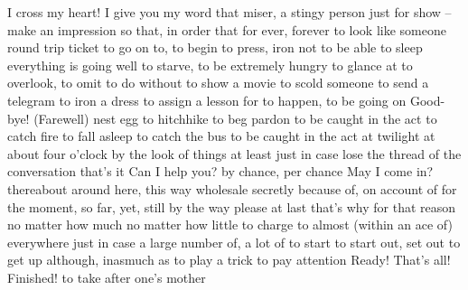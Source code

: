 {I cross my heart!}
{I give you my word that}
{miser, a stingy person}
{just for show – make an impression}
{so that, in order that}
{for ever, forever}
{to look like someone}
{round trip ticket}
{to go on to, to begin}
{to press, iron}
{not to be able to sleep}
{everything is going well}
{to starve, to be extremely hungry}
{to glance at}
{to overlook, to omit}
{to do without}
{to show a movie}
{to scold someone}
{to send a telegram}
{to iron a dress}
{to assign a lesson for}
{to happen, to be going on}
{Good-bye! (Farewell)}
{nest egg}
{to hitchhike}
{to beg pardon}
{to be caught in the act}
{to catch fire}
{to fall asleep}
{to catch the bus}
{to be caught in the act}
{at twilight}
{at about four o’clock}
{by the look of things}
{at least}
{just in case}
{lose the thread of the conversation}
{that’s it}
{Can I help you?}
{by chance, per chance}
{May I come in?}
{thereabout}
{around here, this way}
{wholesale}
{secretly}
{because of, on account of}
{for the moment, so far, yet, still}
{by the way}
{please}
{at last}
{that’s why}
{for that reason}
{no matter how much}
{no matter how little}
{to charge to}
{almost (within an ace of)}
{everywhere}
{just in case}
{a large number of, a lot of}
{to start}
{to start out, set out}
{to get up}
{although, inasmuch as}
{to play a trick}
{to pay attention}
{Ready! That’s all! Finished!}
{to take after one’s mother}

